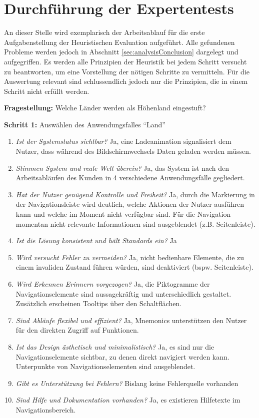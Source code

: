 \section{Durchführung der Expertentests} \label{sec:analysisExecution}
An dieser Stelle wird exemplarisch der Arbeitsablauf für die erste Aufgabenstellung der Heuristischen Evaluation aufgeführt. Alle gefundenen Probleme werden jedoch in Abschnitt \ref{sec:analysisConclusion} dargelegt und aufgegriffen. Es werden alle Prinzipien der Heuristik bei jedem Schritt versucht zu beantworten, um eine Vorstellung der nötigen Schritte zu vermitteln. Für die Auswertung relevant sind schlussendlich jedoch nur die Prinzipien, die in einem Schritt nicht erfüllt werden.\par
\textbf{Fragestellung:} Welche Länder werden als Höhenland eingestuft?\par
\textbf{Schritt 1:} Auswählen des Anwendungsfalles \enquote{Land}
\begin{enumerate}
 \item \textit{Ist der Systemstatus sichtbar?} Ja, eine Ladeanimation signalisiert dem Nutzer, dass während des Bildschirmwechsels Daten geladen werden müssen.
 \item \textit{Stimmen System und reale Welt überein?} Ja, das System ist nach den Arbeitsabläufen des Kunden in 4 verschiedene Anwendungsfälle gegliedert.
 \item \textit{Hat der Nutzer genügend Kontrolle und Freiheit?} Ja, durch die Markierung in der Navigationsleiste wird deutlich, welche Aktionen der Nutzer ausführen kann und welche im Moment nicht verfügbar sind. Für die Navigation momentan nicht relevante Informationen sind ausgeblendet (z.B. Seitenleiste).
 \item \textit{Ist die Lösung konsistent und hält Standards ein?} Ja
 \item \textit{Wird versucht Fehler zu vermeiden?} Ja, nicht bedienbare Elemente, die zu einem invaliden Zustand führen würden, sind deaktiviert (bspw. Seitenleiste).
 \item \textit{Wird Erkennen Erinnern vorgezogen?} Ja, die Piktogramme der Navigationselemente sind aussagekräftig und unterschiedlich gestaltet. Zusätzlich erscheinen Tooltips über den Schaltflächen.
 \item \textit{Sind Abläufe flexibel und effizient?} Ja, Mnemonics unterstützen den Nutzer für den direkten Zugriff auf Funktionen.
 \item \textit{Ist das Design ästhetisch und minimalistisch?} Ja, es sind nur die Navigationselemente sichtbar, zu denen direkt navigiert werden kann. Unterpunkte von Navigationselementen sind ausgeblendet.
 \item \textit{Gibt es Unterstützung bei Fehlern?} Bislang keine Fehlerquelle vorhanden
 \item \textit{Sind Hilfe und Dokumentation vorhanden?} Ja, es existieren Hilfetexte im Navigationsbereich. 
\end{enumerate}
